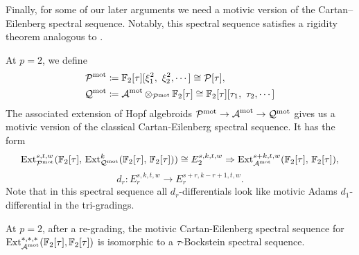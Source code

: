 Finally, for some of our later arguments we need a motivic version of the Cartan--Eilenberg spectral sequence.
Notably, this spectral sequence satisfies a rigidity theorem analogous to .

\begin{cnstr}
  At $p=2$, we define 
  \begin{align*}
    \mathcal{P}^\textup{mot} & \coloneqq \operatorname{\mathbb{F}}_2[\tau][\xi_1^2, \ \xi_2^2, \cdots] \cong \mathcal{P}[\tau], \\ 
    \mathcal{Q}^{\textup{mot}} & \coloneqq \operatorname{\mathcal{A}}^{\textup{mot}}\otimes_{\mathcal{P}^{\textup{mot}}} \operatorname{\mathbb{F}}_2[\tau] \cong \operatorname{\mathbb{F}}_2[\tau][\tau_1, \ \tau_2, \cdots]
  \end{align*}
  The associated extension of Hopf algebroids
  $\mathcal{P}^\textup{mot} \rightarrow \operatorname{\mathcal{A}}^\textup{mot} \rightarrow \mathcal{Q}^\textup{mot}$
  gives us a motivic version of the classical Cartan-Eilenberg spectral sequence.
  It has the form
  $$ \operatorname{\mathrm{Ext}}^{s,t,w}_{\mathcal{P}^\textup{mot}}(\operatorname{\mathbb{F}}_2[\tau],\, \operatorname{\mathrm{Ext}}^k_{\mathcal{Q}^\textup{mot}}(\operatorname{\mathbb{F}}_2[\tau],\, \operatorname{\mathbb{F}}_2[\tau])) \cong E_2^{s,k,t,w} \Rightarrow \operatorname{\mathrm{Ext}}^{s+k, t, w}_{\operatorname{\mathcal{A}}^\textup{mot}}(\operatorname{\mathbb{F}}_2[\tau],\, \operatorname{\mathbb{F}}_2[\tau]), $$
$$d_r: E_r^{s,k,t,w} \to E_r^{s+r, k-r+1, t, w}.$$
  Note that in this spectral sequence all $d_r$-differentials look like motivic Adams $d_1$-differential in the tri-gradings.
\end{cnstr}


\begin{thm} \label{MCESS tau Bockstein}
At $p=2$, after a re-grading, the motivic Cartan-Eilenberg spectral sequence for $ \operatorname{\mathrm{Ext}}_{{\operatorname{\mathcal{A}}}^{\textup{mot}}}^{*, *, *}(\operatorname{\mathbb{F}}_2[\tau], \operatorname{\mathbb{F}}_2[\tau])$ is isomorphic to a $\tau$-Bockstein spectral sequence.
\end{thm}

